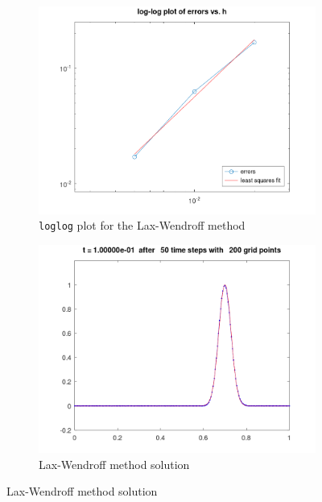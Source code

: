 \begin{solution}
    \begin{figure}[h]
        \centering
        \begin{subfigure}{0.45\textwidth}
            \includegraphics*[width=\textwidth]{problem_3a_error.png}
            \caption{\texttt{loglog} plot for the Lax-Wendroff method}
        \end{subfigure}
        \hfill
        \begin{subfigure}{0.45\textwidth}
            \includegraphics*[width=\textwidth]{problem_3a.png}
            \caption{Lax-Wendroff method solution}
        \end{subfigure}
    \end{figure}
\end{solution}